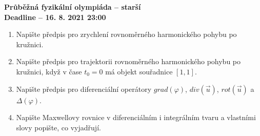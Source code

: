 \documentclass[a4paper, 12pt]{article}
\newcommand{\grad}{grad}
\newcommand{\dive}{div}
\newcommand{\rot}{rot}
\begin{document}
\begin{center}
\textbf{{\large
Průběžná fyzikální olympiáda -- starší\\
Deadline -- 16. 8. 2021 23:00
}}

\end{center}


\begin{enumerate} [1)]
\item\relax[1 bod] Napište předpis pro zrychlení rovnoměrného harmonického pohybu po kružnici. 
\item\relax[2 body] Napište předpis pro trajektorii rovnoměrného harmonického pohybu po kružnici, když v čase $t_0=0$ má objekt souřadnice $[1,1]$.
\item\relax[3 body] Napište předpis pro diferenciální operátory $\grad(\varphi)$, $\dive(\Vec{u})$, $\rot(\Vec{u})$ a $\Delta(\varphi)$.
\item\relax[5 bodů] Napište Maxwellovy rovnice v diferenciálním i integrálním tvaru a vlastními slovy popište, co vyjadřují.
\end{enumerate}
\end{document}
